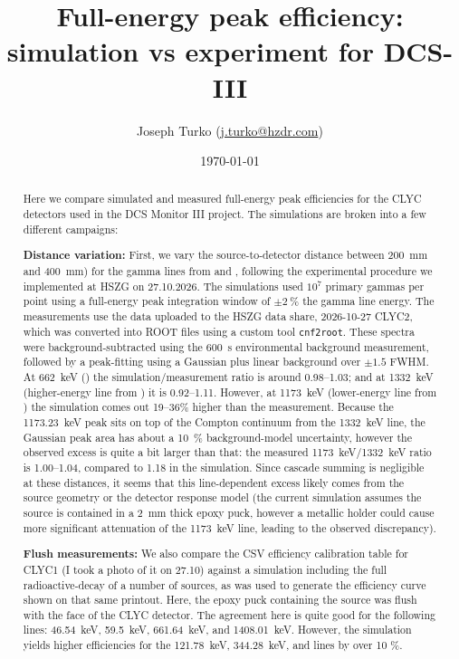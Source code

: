 \documentclass[11pt,a4paper]{article}
\title{Full-energy peak efficiency: simulation vs experiment for DCS-III}
\author{Joseph Turko (\href{mailto:j.turko@hzdr.com}{j.turko@hzdr.com})}
\date{\today}
\begin{document}
\maketitle

\begin{abstract}
Here we compare simulated and measured full-energy peak efficiencies for the CLYC detectors used in the DCS Monitor III project. 
The simulations are broken into a few different campaigns:

\noindent\textbf{Distance variation:} First, we vary the source-to-detector distance between \SI{200}{mm} and \SI{400}{mm}) for the gamma lines from  and , following the experimental procedure we implemented at HSZG on 27.10.2026. 
The simulations used $10^7$ primary gammas per point using a full-energy peak integration window of $\pm\SI{2}{\percent}$ the gamma line energy. 
The measurements use the data uploaded to the HSZG data share, 2026-10-27 CLYC2, which was converted into ROOT files using a custom tool \texttt{cnf2root}.
These spectra were background-subtracted using the \SI{600}{s} environmental background measurement, followed by a peak-fitting using a Gaussian plus linear background over $\pm1.5$ FWHM. 
At \SI{662}{keV} () the simulation/measurement ratio is around 0.98--1.03; and at \SI{1332}{keV} (higher-energy line from ) it is 0.92--1.11. 
However, at \SI{1173}{keV} (lower-energy line from ) the simulation comes out 19--36\% higher than the measurement. 
Because the \SI{1173.23}{keV} peak sits on top of the Compton continuum from the \SI{1332}{keV} line, the Gaussian peak area has about a \SI{10}{\percent} background-model uncertainty, however the observed excess is quite a bit larger than that: the measured \SI{1173}{keV}/\SI{1332}{keV} ratio is 1.00--1.04, compared to 1.18 in the simulation. 
Since cascade summing is negligible at these distances, it seems that this line-dependent excess likely comes from the  source geometry or the detector response model (the current simulation assumes the source is contained in a \SI{2}{\milli\meter} thick epoxy puck, however a metallic holder could cause more significant attenuation of the \SI{1173}{keV} line, leading to the observed discrepancy).

\noindent\textbf{Flush measurements:} We also compare the CSV efficiency calibration table for CLYC1 (I took a photo of it on 27.10) against a simulation including the full radioactive-decay of a number of sources, as was used to generate the efficiency curve shown on that same printout.
Here, the epoxy puck containing the source was flush with the face of the CLYC detector.
The agreement here is quite good for the following lines: \SI{46.54}{keV}, \SI{59.5}{keV}, \SI{661.64}{keV}, and \SI{1408.01}{keV}.
However, the simulation yields higher efficiencies for the \SI{121.78}{keV}, \SI{344.28}{keV}, and  lines by over 10 \%.


\end{abstract}
\end{document}
